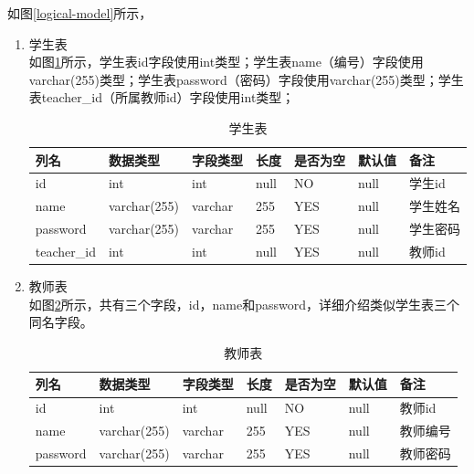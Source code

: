 如图\ref{logical-model}所示，
\begin{enumerate}
    \item 学生表\\
          如图\ref{db-student}所示，学生表id字段使用int类型；学生表name（编号）字段使用varchar(255)类型；学生表password（密码）字段使用varchar(255)类型；学生表teacher\_id（所属教师id）字段使用int类型；
          \begin{table}[]
              \centering
              \song\wuhao
              \caption{学生表}
              \label{db-student}
              \begin{tabular}{|l|l|l|l|l|l|l|}
                  \hline
                  列名        & 数据类型     & 字段类型 & 长度 & 是否为空 & 默认值 & 备注     \\ \hline
                  id          & int          & int      & null & NO       & null   & 学生id   \\ \hline
                  name        & varchar(255) & varchar  & 255  & YES      & null   & 学生姓名 \\ \hline
                  password    & varchar(255) & varchar  & 255  & YES      & null   & 学生密码 \\ \hline
                  teacher\_id & int          & int      & null & YES      & null   & 教师id   \\ \hline
              \end{tabular}
          \end{table}
    \item 教师表\\
          如图\ref{db-teacher}所示，共有三个字段，id，name和password，详细介绍类似学生表三个同名字段。
          \begin{table}[H]
              \centering
              \song\wuhao
              \caption{教师表}
              \label{db-teacher}
              \begin{tabular}{|l|l|l|l|l|l|l|}
                  \hline
                  列名     & 数据类型     & 字段类型 & 长度 & 是否为空 & 默认值 & 备注     \\ \hline
                  id       & int          & int      & null & NO       & null   & 教师id   \\ \hline
                  name     & varchar(255) & varchar  & 255  & YES      & null   & 教师编号 \\ \hline
                  password & varchar(255) & varchar  & 255  & YES      & null   & 教师密码 \\ \hline
              \end{tabular}

\end{table}
\end{enumerate}
